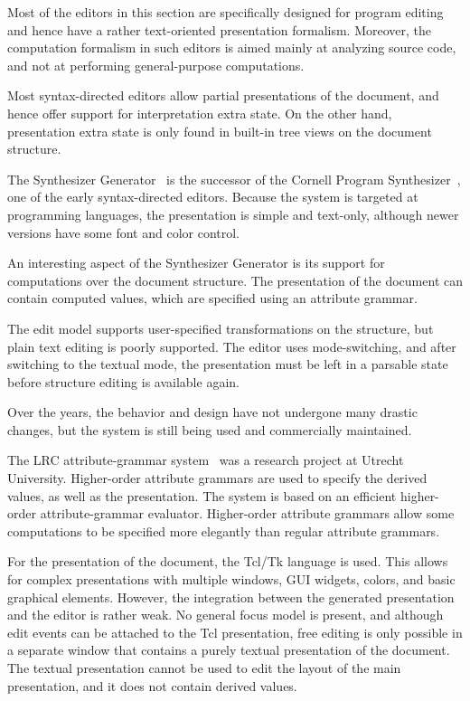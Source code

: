 \documentclass{entcs}
\begin{document}
Most of the editors in this section are specifically designed for program editing and hence have a rather text-oriented presentation formalism. Moreover, the computation formalism in such editors is aimed mainly at analyzing source code, and not at performing general-purpose computations. 

Most syntax-directed editors allow partial presentations of the document, and hence offer support for interpretation extra state. On the other hand, presentation extra state is only found in built-in tree views on the document structure.


The Synthesizer Generator~\cite{reps84synGen} is the successor of the Cornell Program Synthesizer~\cite{teitelbaum81progSynth}, one of the early syntax-directed editors. Because the system is targeted at programming languages, the presentation is simple and text-only, although newer versions have some font and color control. 


An interesting aspect of the Synthesizer Generator is its support for computations over the document structure. The presentation of the document can contain computed values, which are specified using an attribute grammar. 

The edit model supports user-specified transformations on the structure, but plain text editing is poorly supported. The editor uses mode-switching, and after switching to the textual mode, the presentation must be left in a parsable state before structure editing is available again.

Over the years, the behavior and design have not undergone many drastic changes, but the system is still being used and commercially maintained.


The LRC attribute-grammar system~\cite{saraiva00lrc} was a research project at Utrecht University. Higher-order attribute grammars are used to specify the derived values, as well as the presentation. The system is based on an efficient higher-order attribute-grammar evaluator. Higher-order attribute grammars allow some computations to be specified more elegantly than regular attribute grammars.

For the presentation of the document, the Tcl/Tk language is used. This allows for complex presentations with multiple windows, GUI widgets, colors, and basic graphical elements. However, the integration between the generated presentation and the editor is rather weak. No general focus model is present, and although edit events can be attached to the Tcl presentation, free editing is only possible in a separate window that contains a purely textual presentation of the document. The textual presentation cannot be used to edit the layout of the main presentation, and it does not contain derived values. 
\end{document}
